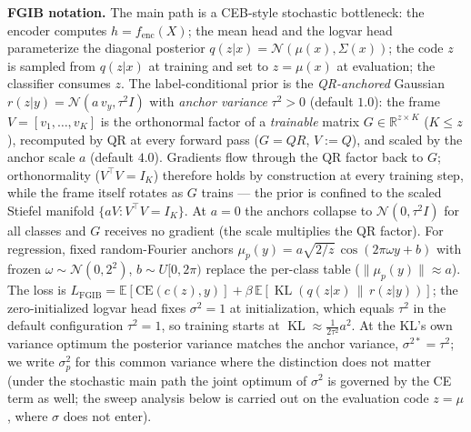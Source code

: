\textbf{FGIB notation.}
The main path is a CEB-style stochastic bottleneck: the encoder computes
$h = f_{\mathrm{enc}}(X)$; the mean head and the logvar head parameterize the diagonal
posterior $q(z|x) = \mathcal{N}(\mu(x), \Sigma(x))$; the code $z$ is sampled from
$q(z|x)$ at training and set to $z = \mu(x)$ at evaluation; the classifier consumes
$z$. The label-conditional prior is the \emph{QR-anchored} Gaussian
$r(z|y) = \mathcal{N}(a\,v_y, \tau^2 I)$ with \emph{anchor variance} $\tau^2 > 0$
(default $1.0$): the frame $V = [v_1, \dots, v_K]$ is the orthonormal factor of a
\emph{trainable} matrix $G \in \mathbb{R}^{z \times K}$ ($K \le z$), recomputed by
QR at every forward pass ($G = QR$, $V := Q$), and scaled by the anchor scale $a$
(default $4.0$). Gradients flow through the QR factor back to $G$; orthonormality
($V^{\top}V = I_K$) therefore holds by construction at every training step, while the
frame itself rotates as $G$ trains --- the prior is confined to the scaled Stiefel
manifold $\{aV : V^{\top}V = I_K\}$. At $a = 0$ the anchors collapse to
$\mathcal{N}(0, \tau^2 I)$ for all classes and $G$ receives no gradient (the scale
multiplies the QR factor). For regression, fixed random-Fourier anchors
$\mu_p(y) = a\sqrt{2/z}\,\cos(2\pi\omega y + b)$ with frozen
$\omega \sim \mathcal{N}(0, 2^2)$, $b \sim U[0, 2\pi)$ replace the per-class table
($\|\mu_p(y)\| \approx a$). The loss is
$L_{\mathrm{FGIB}} = \mathbb{E}[\mathrm{CE}(c(z), y)]
+ \beta\,\mathbb{E}[\operatorname{KL}(q(z|x)\,\|\,r(z|y))]$; the zero-initialized
logvar head fixes $\sigma^2 = 1$ at initialization, which equals $\tau^2$ in the
default configuration $\tau^2 = 1$, so training starts at
$\operatorname{KL} \approx \tfrac{1}{2\tau^2} a^2$. At the KL's own variance optimum
the posterior variance matches the anchor variance, $\sigma^{2*} = \tau^2$; we write
$\sigma_p^2$ for this common variance where the distinction does not matter (under the
stochastic main path the joint optimum of $\sigma^2$ is governed by the CE term as
well; the sweep analysis below is carried out on the evaluation code $z = \mu$, where
$\sigma$ does not enter).

